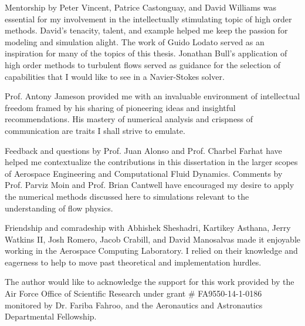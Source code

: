 
Mentorship by Peter Vincent, Patrice Castonguay, and David Williams was essential for my involvement in the intellectually stimulating topic of high order methods. David's tenacity, talent, and example helped me keep the passion for modeling and simulation alight. The work of Guido Lodato served as an inspiration for many of the topics of this thesis. Jonathan Bull's application of high order methods to turbulent flows served as guidance for the selection of capabilities that I would like to see in a Navier-Stokes solver.

Prof. Antony Jameson provided me with an invaluable environment of intellectual freedom framed by his sharing of pioneering ideas and insightful recommendations. His mastery of numerical analysis and crispness of communication are traits I shall strive to emulate.

Feedback and questions by Prof. Juan Alonso and Prof. Charbel Farhat have helped me contextualize the contributions in this dissertation in the larger scopes of Aerospace Engineering and Computational Fluid Dynamics. Comments by Prof. Parviz Moin and Prof. Brian Cantwell have encouraged my desire to apply the numerical methods discussed here to simulations relevant to the understanding of flow physics.

Friendship and comradeship with Abhishek Sheshadri, Kartikey Asthana, Jerry Watkins II, Josh Romero, Jacob Crabill, and David Manosalvas made it enjoyable working in the Aerospace Computing Laboratory. I relied on their knowledge and eagerness to help to move past theoretical and implementation hurdles.

The author would like to acknowledge the support for this work provided by the Air Force Office of Scientific Research under grant \# FA9550-14-1-0186 monitored by Dr. Fariba Fahroo, and the Aeronautics and Astronautics Departmental Fellowship.